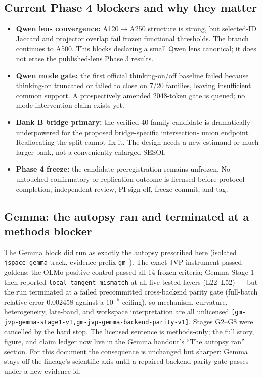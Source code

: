 \documentclass[11pt]{article}
\newcommand{\eid}[1]{{\footnotesize\nolinkurl{[#1]}}}
\begin{document}
\subsection{Current Phase 4 blockers and why they matter}

\begin{itemize}
  \item \textbf{Qwen lens convergence:} A120$\to$A250 structure is strong,
  but selected-ID Jaccard and projector overlap fail frozen functional
  thresholds. The branch continues to A500. This blocks declaring a small
  Qwen lens canonical; it does not erase the published-lens Phase 3 results.
  \item \textbf{Qwen mode gate:} the first official thinking-on/off baseline
  failed because thinking-on truncated or failed to close on 7/20 families,
  leaving insufficient common support. A prospectively amended 2048-token gate
  is queued; no mode intervention claim exists yet.
  \item \textbf{Bank B bridge primary:} the verified 40-family candidate is
  dramatically underpowered for the proposed bridge-specific intersection-
  union endpoint. Reallocating the split cannot fix it. The design needs a new
  estimand or much larger bank, not a conveniently enlarged SESOI.
  \item \textbf{Phase 4 freeze:} the candidate preregistration remains
  unfrozen. No untouched confirmatory or replication outcome is licensed
  before protocol completion, independent review, PI sign-off, freeze commit,
  and tag.
\end{itemize}

\subsection{Gemma: the autopsy ran and terminated at a methods blocker}

The Gemma block did run as exactly the autopsy prescribed here (isolated
\texttt{jspace\_gemma} track, evidence prefix \texttt{gm-}). The exact-JVP
instrument passed goldens; the OLMo positive control passed all 14 frozen
criteria; Gemma Stage 1 then reported \texttt{local\_tangent\_mismatch} at
all five tested layers (L22--L52) --- but the run terminated at a failed
precommitted cross-backend parity gate (full-batch relative error 0.002458
against a $10^{-5}$ ceiling), so mechanism, curvature, heterogeneity,
late-band, and workspace interpretation are all unlicensed
\eid{gm-jvp-gemma-stage1-v1,gm-jvp-gemma-backend-parity-v1}. Stages G2--G8
were cancelled by the hard stop. The licensed sentence is methods-only; the
full story, figure, and claim ledger now live in the Gemma handout's
``The autopsy ran'' section. For this document the consequence is unchanged
but sharper: Gemma stays off the lineage's scientific axis until a repaired
backend-parity gate passes under a new evidence id.
\end{document}
